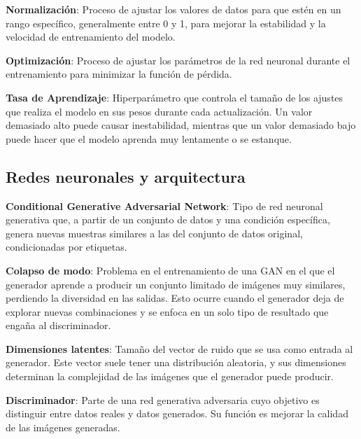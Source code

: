\textbf{Normalización}: Proceso de ajustar los valores de datos para que estén en un rango específico, generalmente entre 0 y 1, para mejorar la estabilidad y la velocidad de entrenamiento del modelo.

\vspace{5mm}

\textbf{Optimización}: Proceso de ajustar los parámetros de la red neuronal durante el entrenamiento para minimizar la función de pérdida.

\vspace{5mm}

\textbf{Tasa de Aprendizaje}: Hiperparámetro que controla el tamaño de los ajustes que realiza el modelo en sus pesos durante cada actualización. Un valor demasiado alto puede causar inestabilidad, mientras que un valor demasiado bajo puede hacer que el modelo aprenda muy lentamente o se estanque.

\vspace{5mm}


\subsection{Redes neuronales y arquitectura}
\textbf{Conditional Generative Adversarial Network}: Tipo de red neuronal generativa que, a partir de un conjunto de datos y una condición específica, genera nuevas muestras similares a las del conjunto de datos original, condicionadas por etiquetas.

\vspace{5mm}

\textbf{Colapso de modo}: Problema en el entrenamiento de una GAN en el que el generador aprende a producir un conjunto limitado de imágenes muy similares, perdiendo la diversidad en las salidas. Esto ocurre cuando el generador deja de explorar nuevas combinaciones y se enfoca en un solo tipo de resultado que engaña al discriminador.

\vspace{5mm}

\textbf{Dimensiones latentes}: Tamaño del vector de ruido que se usa como entrada al generador. Este vector suele tener una distribución aleatoria, y sus dimensiones determinan la complejidad de las imágenes que el generador puede producir.

\vspace{5mm}

\textbf{Discriminador}: Parte de una red generativa adversaria cuyo objetivo es distinguir entre datos reales y datos generados. Su función es mejorar la calidad de las imágenes generadas.

